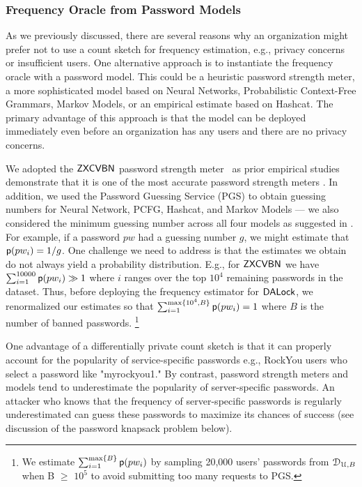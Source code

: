 \vspace*{-\baselineskip}
\vspace*{-\baselineskip}
\subsubsection{Frequency Oracle from Password Models} \label{subsubsec:FreqOracle}
\vspace*{-\baselineskip}

As we previously discussed, there are several reasons why an organization might prefer not to use a count sketch for frequency estimation, e.g., privacy concerns or insufficient users. One alternative approach is to instantiate the frequency oracle with a password model. This could be a heuristic password strength meter, a more sophisticated model based on Neural Networks, Probabilistic Context-Free Grammars,  Markov Models, or an empirical estimate based on Hashcat. The primary advantage of this approach is that the model can be deployed immediately even before an organization has any users and there are no privacy concerns. 


We adopted the $\mathsf{ZXCVBN}$ password strength meter~\cite{USENIX:Wheeler16} as prior empirical studies demonstrate that it is one of the most accurate password strength meters \cite{CCS:GolDur18}. In addition, we used the Password Guessing Service (PGS) \cite{USENIX:USBCCKKMMS15,USENIX:MUSKBCC16} to obtain guessing numbers for Neural Network, PCFG, Hashcat, and Markov Models ---  we also considered the minimum guessing number across all four models as suggested in \cite{USENIX:USBCCKKMMS15}. For example, if a password $pw$ had a guessing number $g$, we might estimate that $\textsf{p}(pw_i) =1/g$. One challenge we need to address is that the estimates we obtain do not always yield a probability distribution. E.g., for $\mathsf{ZXCVBN}$ we have $\sum_{i=1}^{10000}\textsf{p}(pw_i) \gg 1$ where $i$ ranges over the top $10^4$ remaining passwords in the dataset. Thus, before deploying the frequency estimator for $\mathsf{DALock}$, we renormalized our estimates so that $\sum_{i=1}^{\max\{10^4, B\}}\textsf{p}(pw_i) =1$ where $B$ is the number of banned passwords. \footnote{We estimate $\sum_{i=1}^{\max\{B\}}\textsf{p}(pw_i)$ by sampling 20,000 users' passwords from $\mathcal{D}_{{\mathcal{U},B}}$ when B $\ge$ $10^5$ to avoid submitting too many requests to PGS.}


{
	 One advantage of a differentially private count sketch is that it can properly account for the popularity of service-specific passwords e.g., RockYou users who select a password like "myrockyou1." By contrast, password strength meters and models tend to underestimate the popularity of server-specific passwords. An attacker who knows that the frequency of server-specific passwords is regularly underestimated can guess these passwords to maximize its chances of success (see discussion of the password knapsack problem below).     
}






